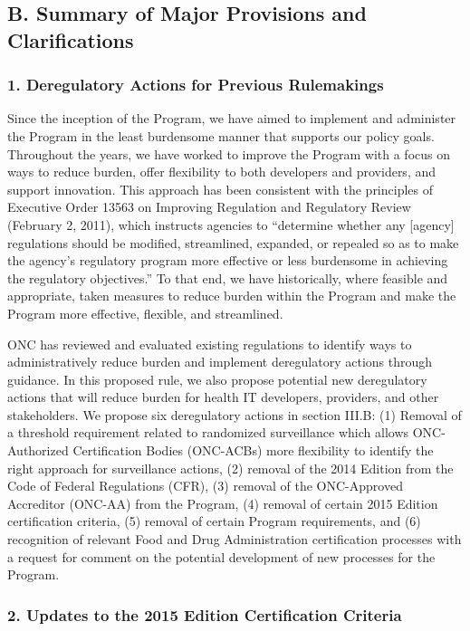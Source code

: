 \documentclass[twoside,11pt]{article}
\begin{document}
          \subsection{B. Summary of Major Provisions and Clarifications}

          \subsubsection{1. Deregulatory Actions for Previous Rulemakings}

          Since the inception of the Program, we have aimed to implement and administer the Program in the least burdensome manner that supports our policy goals. Throughout the years, we have worked to improve the Program with a focus on ways to reduce burden, offer flexibility to both developers and providers, and support innovation. This approach has been consistent with the principles of Executive Order 13563 on Improving Regulation and Regulatory Review (February 2, 2011), which instructs agencies to “determine whether any [agency] regulations should be modified, streamlined, expanded, or repealed so as to make the agency's regulatory program more effective or less burdensome in achieving the regulatory objectives.” To that end, we have historically, where feasible and appropriate, taken measures to reduce burden within the Program and make the Program more effective, flexible, and streamlined.


          ONC has reviewed and evaluated existing regulations to identify ways to administratively reduce burden and implement deregulatory actions through guidance. In this proposed rule, we also propose potential new deregulatory actions that will reduce burden for health IT developers, providers, and other stakeholders. We propose six deregulatory actions in section III.B: (1) Removal of a threshold requirement related to randomized surveillance which allows ONC-Authorized Certification Bodies (ONC-ACBs) more flexibility to identify the right approach for surveillance actions, (2) removal of the 2014 Edition from the Code of Federal Regulations (CFR), (3) removal of the ONC-Approved Accreditor (ONC-AA) from the Program, (4) removal of certain 2015 Edition certification criteria, (5) removal of certain Program requirements, and (6) recognition of relevant Food and Drug Administration certification processes with a request for comment on the potential development of new processes for the Program.


          \subsubsection{2. Updates to the 2015 Edition Certification Criteria}
\end{document}
